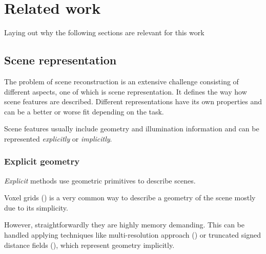 \chapter{Related work}
\label{chap:related_work}


Laying out why the following sections are relevant for this work




\section{Scene representation}

The problem of scene reconstruction is an extensive challenge consisting of different aspects,
one of which is scene representation.
It defines the way how scene features are described.
Different representations have its own properties and can be a better or worse fit depending on the task.

Scene features usually include geometry and illumination information
and can be represented \textit{explicitly} or \textit{implicitly}.

\subsection{Explicit geometry}

\textit{Explicit} methods use geometric primitives to describe scenes.

Voxel grids (\cite{Lombardi_2019}) is a very common way to describe a geometry of the scene mostly due to its simplicity.

However, straightforwardly they are highly memory demanding.
This can be handled applying techniques like multi-resolution approach (\cite{häne2017hierarchical})
or truncated signed distance fields (\cite{truncdistfield1996curless}),
which represent geometry implicitly.

